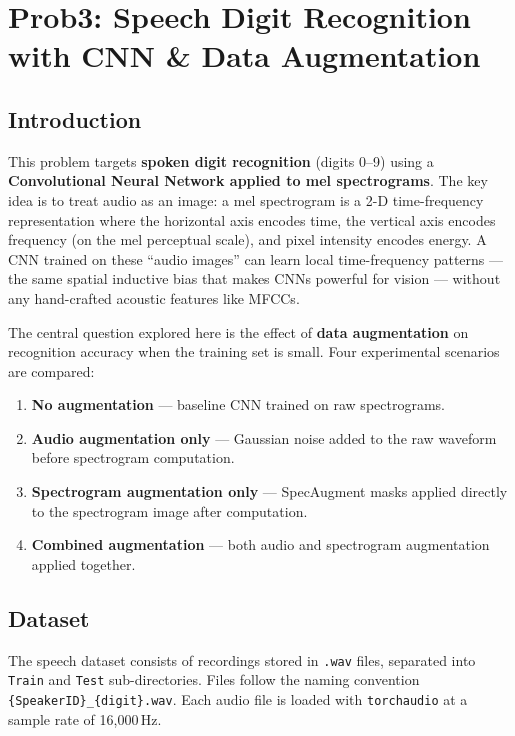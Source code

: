 \documentclass[12pt, a4paper]{article}
\begin{document}
\newpage

\section{Prob3: Speech Digit Recognition with CNN & Data Augmentation}

\subsection{Introduction}

This problem targets \textbf{spoken digit recognition} (digits 0--9) using a
\textbf{Convolutional Neural Network applied to mel spectrograms}. The key idea is to
treat audio as an image: a mel spectrogram is a 2-D time-frequency representation
where the horizontal axis encodes time, the vertical axis encodes frequency (on the
mel perceptual scale), and pixel intensity encodes energy. A CNN trained on these
``audio images'' can learn local time-frequency patterns --- the same spatial inductive
bias that makes CNNs powerful for vision --- without any hand-crafted acoustic features
like MFCCs.

The central question explored here is the effect of \textbf{data augmentation} on
recognition accuracy when the training set is small. Four experimental scenarios are
compared:

\begin{enumerate}[label=\textbf{\Alph*.}]
    \item \textbf{No augmentation} --- baseline CNN trained on raw spectrograms.
    \item \textbf{Audio augmentation only} --- Gaussian noise added to the raw waveform
          before spectrogram computation.
    \item \textbf{Spectrogram augmentation only} --- SpecAugment masks applied directly
          to the spectrogram image after computation.
    \item \textbf{Combined augmentation} --- both audio and spectrogram augmentation
          applied together.
\end{enumerate}




\subsection{Dataset}
The speech dataset consists of recordings stored in \texttt{.wav} files, separated into
\texttt{Train} and \texttt{Test} sub-directories. Files follow the naming convention
\texttt{\{SpeakerID\}\_\{digit\}.wav}. Each audio file is loaded with
\texttt{torchaudio} at a sample rate of 16{,}000\,Hz.
\end{document}
